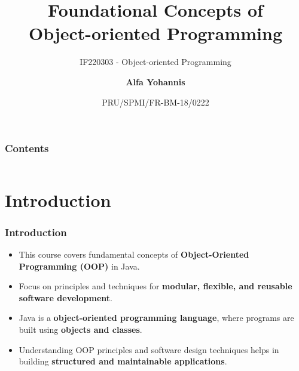 \documentclass[aspectratio=169, table]{beamer}
\subtitle{IF220303 - Object-oriented Programming}
\title{\LARGE Foundational Concepts of\\Object-oriented Programming \vspace{10pt}}
\date[Serial]{\scriptsize {PRU/SPMI/FR-BM-18/0222}}
\author[Pradita]{\small {\textbf{Alfa Yohannis}}}
\begin{document}
	
	\frame{\titlepage}
%	
%	
	
\begin{frame}[fragile]
	\frametitle{Contents}
	
	\begin{columns}[t]
		\tableofcontents[sections={1-6}]
		
		\tableofcontents[sections={7-12}]
	\end{columns}
\end{frame}


\section{Introduction}

\begin{frame}[fragile]
	\frametitle{Introduction}
	
	\begin{itemize}
		\item This course covers fundamental concepts of \textbf{Object-Oriented Programming (OOP)} in Java.
		\item Focus on principles and techniques for \textbf{modular, flexible, and reusable software development}.
		\item Java is a \textbf{object-oriented programming language}, where programs are built using \textbf{objects and classes}.
		\item Understanding OOP principles and software design techniques helps in building \textbf{structured and maintainable applications}.
	\end{itemize}
\end{frame}
\end{document}
